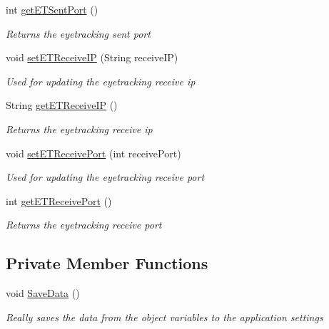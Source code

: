 \begin{DoxyCompactItemize}
int \hyperlink{class_web_analyzer_1_1_u_i_1_1_interaction_objects_1_1_application_settings_obj_ab6c124b501ab3830c1ca44d03257ba3b}{get\+E\+T\+Sent\+Port} ()
\begin{DoxyCompactList}\small\item\em Returns the eyetracking sent port \end{DoxyCompactList}\item 
void \hyperlink{class_web_analyzer_1_1_u_i_1_1_interaction_objects_1_1_application_settings_obj_afb010b22324d88dd1c3d51d710e3c8f2}{set\+E\+T\+Receive\+I\+P} (String receive\+I\+P)
\begin{DoxyCompactList}\small\item\em Used for updating the eyetracking receive ip \end{DoxyCompactList}\item 
String \hyperlink{class_web_analyzer_1_1_u_i_1_1_interaction_objects_1_1_application_settings_obj_a5d73249a3c35ae7c83fcf446db49af64}{get\+E\+T\+Receive\+I\+P} ()
\begin{DoxyCompactList}\small\item\em Returns the eyetracking receive ip \end{DoxyCompactList}\item 
void \hyperlink{class_web_analyzer_1_1_u_i_1_1_interaction_objects_1_1_application_settings_obj_acd7bd62bfa3f59a0ef1639d6c7252978}{set\+E\+T\+Receive\+Port} (int receive\+Port)
\begin{DoxyCompactList}\small\item\em Used for updating the eyetracking receive port \end{DoxyCompactList}\item 
int \hyperlink{class_web_analyzer_1_1_u_i_1_1_interaction_objects_1_1_application_settings_obj_a03787263c42b3f67c0ce49a8d68919c0}{get\+E\+T\+Receive\+Port} ()
\begin{DoxyCompactList}\small\item\em Returns the eyetracking receive port \end{DoxyCompactList}\end{DoxyCompactItemize}
\subsection*{Private Member Functions}
\begin{DoxyCompactItemize}
\item 
void \hyperlink{class_web_analyzer_1_1_u_i_1_1_interaction_objects_1_1_application_settings_obj_aaa5e35a08358da0c68958a15bd47bc57}{Save\+Data} ()
\begin{DoxyCompactList}\small\item\em Really saves the data from the object variables to the application settings \end{DoxyCompactList}\end{DoxyCompactItemize}
